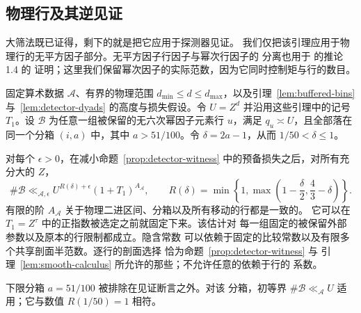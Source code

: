 \subsection{物理行及其逆见证}

大筛法既已证得，剩下的就是把它应用于探测器见证。
我们仅把该引理应用于物理行的无平方因子部分。无平方因子行因子与幂次行因子的
分离也用于 \cite{BGL} 的推论 1.4 的
证明；这里我们保留幂次因子的实际范数，因为它同时控制矩与行的数目。

\begin{proposition}[六次大筛法行包络]\label{prop:sextic-row-count}
固定算术数据 $\mathcal A$、有界的物理范围
$d_{\min}\le d\le d_{\max}$，以及引理~\ref{lem:buffered-bins} 与~\ref{lem:detector-dyads} 的高度与损失假设。令
$U=Z^d$ 并沿用这些引理中的记号 $T_1$。设 $\mathcal B$
为任意一组被保留的无六次幂因子元素行 $u$，满足
$q_u\asymp U$，且全部落在同一个分箱 $(i,a)$ 中，其中 $a>51/100$。令
$\delta=2a-1$，从而 $1/50<\delta\le1$。

对每个 $\epsilon>0$，在减小命题~\ref{prop:detector-witness} 中的预备损失之后，对所有充分大的 $Z$，
\begin{equation}\label{eq:sextic-row-count}
 \#\mathcal B\ll_{\mathcal A,\epsilon}
 U^{R(\delta)+\epsilon}(1+T_1)^{A_{\mathcal A}},
 \qquad
 R(\delta)=\min\left\{1,
       \max\left(1-\frac\delta2,\frac43-\delta\right)\right\}.
\end{equation}
有限的阶 $A_{\mathcal A}$ 关于物理二进区间、分箱以及所有移动的行都是一致的。
它可以在 $T_1=Z^\tau$ 中的正指数被选定之前就固定下来。该估计对
每一组固定的被保留外部参数以及原本的行限制都成立。隐含常数
可以依赖于固定的比较常数以及有限多个共享剖面半范数。逐行的剖面选择
恰为命题~\ref{prop:detector-witness} 与
引理~\ref{lem:smooth-calculus} 所允许的那些；不允许任意的依赖于行的
系数。

下限分箱 $a=51/100$ 被排除在见证断言之外。对该
分箱，初等界 $\#\mathcal B\ll_{\mathcal A}U$ 适用；它与数值
$R(1/50)=1$ 相符。
\end{proposition}

